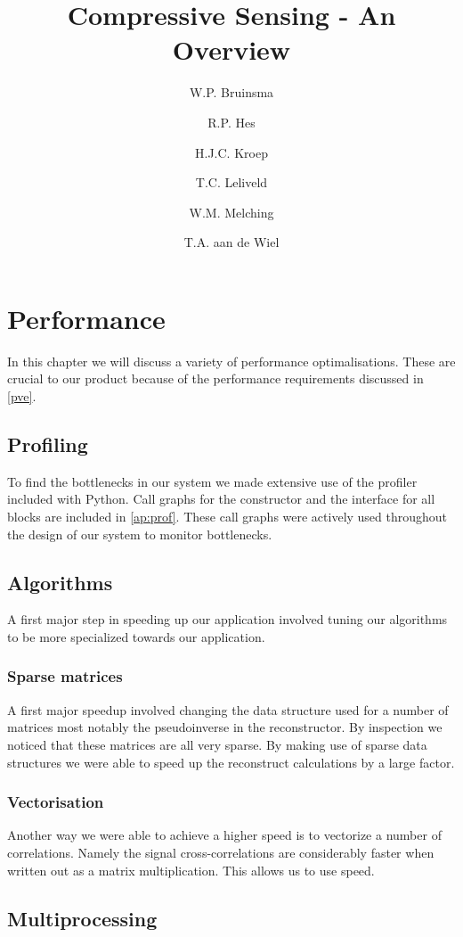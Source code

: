 \documentclass[a4paper, openany, oneside]{memoir}
\title{Compressive Sensing - An Overview}
\author{W.P. Bruinsma \and R.P. Hes \and H.J.C. Kroep \and T.C. Leliveld \and W.M. Melching \and T.A. aan de Wiel}
\begin{document}
\chapter{Performance}
\label{cha:performance}
In this chapter we will discuss a variety of performance optimalisations. These are crucial to our product because of the performance requirements discussed in \cref{pve}. %

\section{Profiling}
\label{sec:performance-profiling}
To find the bottlenecks in our system we made extensive use of the profiler included with Python. Call graphs for the constructor and the interface for all blocks are included in \cref{ap:prof}. These call graphs were actively used throughout the design of our system to monitor bottlenecks.

\section{Algorithms}
A first major step in speeding up our application involved tuning our algorithms to be more specialized towards our application.

\subsection{Sparse matrices}
\label{sec:sparse-matrices}
A first major speedup involved changing the data structure used for a number of matrices most notably the pseudoinverse in the reconstructor. By inspection we noticed that these matrices are all very sparse. By making use of  sparse data structures we were able to speed up the reconstruct calculations by a large factor.

\subsection{Vectorisation}
\label{sec:vectorisation}
Another way we were able to achieve a higher speed is to vectorize a number of correlations. Namely the signal cross-correlations are considerably faster when written out as a matrix multiplication. This allows us to use  speed.

\section{Multiprocessing}
\label{sec:multiprocessing}
\end{document}

